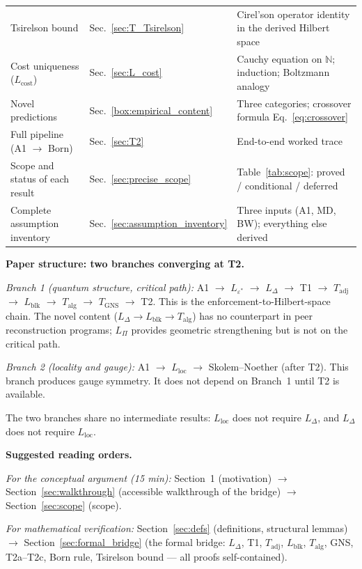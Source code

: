 \documentclass[11pt]{article}
\theoremstyle{remark}
\begin{document}
\begin{tabular}{@{}p{3.5cm}p{2.6cm}p{6.3cm}@{}}
Tsirelson bound & Sec.~\ref{sec:T_Tsirelson} & Cirel'son operator identity in the derived Hilbert space \\[2pt]
Cost uniqueness ($L_{\mathrm{cost}}$) & Sec.~\ref{sec:L_cost} & Cauchy equation on $\mathbb{N}$; induction; Boltzmann analogy \\[2pt]
Novel predictions & Sec.~\ref{box:empirical_content} & Three categories; crossover formula Eq.~\eqref{eq:crossover} \\[2pt]
Full pipeline (A1 $\to$ Born) & Sec.~\ref{sec:T2} & End-to-end worked trace \\[2pt]
Scope and status of each result & Sec.~\ref{sec:precise_scope} & Table~\ref{tab:scope}: proved / conditional / deferred \\[2pt]
Complete assumption inventory & Sec.~\ref{sec:assumption_inventory} & Three inputs (A1, MD, BW); everything else derived \\
\end{tabular}

\medskip\noindent\textbf{Paper structure: two branches converging at T2.}

\smallskip\noindent\textit{Branch 1 (quantum structure, critical path):} A1 $\to$ $L_{\varepsilon^*}$ $\to$ $L_\Delta$ $\to$ T1 $\to$ $T_{\mathrm{adj}}$ $\to$ $L_{\mathrm{blk}}$ $\to$ $T_{\mathrm{alg}}$ $\to$ $T_{\mathrm{GNS}}$ $\to$ T2.  This is the enforcement-to-Hilbert-space chain.  The novel content ($L_\Delta \to L_{\mathrm{blk}} \to T_{\mathrm{alg}}$) has no counterpart in peer reconstruction programs; $L_\Pi$ provides geometric strengthening but is not on the critical path.

\smallskip\noindent\textit{Branch 2 (locality and gauge):} A1 $\to$ $L_{\mathrm{loc}}$ $\to$ Skolem--Noether (after T2).  This branch produces gauge symmetry.  It does not depend on Branch~1 until T2 is available.

\smallskip\noindent The two branches share no intermediate results: $L_{\mathrm{loc}}$ does not require $L_\Delta$, and $L_\Delta$ does not require $L_{\mathrm{loc}}$.

\medskip\noindent\textbf{Suggested reading orders.}

\smallskip\noindent\textit{For the conceptual argument (15 min):} Section~1 (motivation) $\to$ Section~\ref{sec:walkthrough} (accessible walkthrough of the bridge) $\to$ Section~\ref{sec:scope} (scope).

\smallskip\noindent\textit{For mathematical verification:} Section~\ref{sec:defs} (definitions, structural lemmas) $\to$ Section~\ref{sec:formal_bridge} (the formal bridge: $L_\Delta$, T1, $T_{\mathrm{adj}}$, $L_{\mathrm{blk}}$, $T_{\mathrm{alg}}$, GNS, T2a--T2c, Born rule, Tsirelson bound --- all proofs self-contained).
\end{document}
